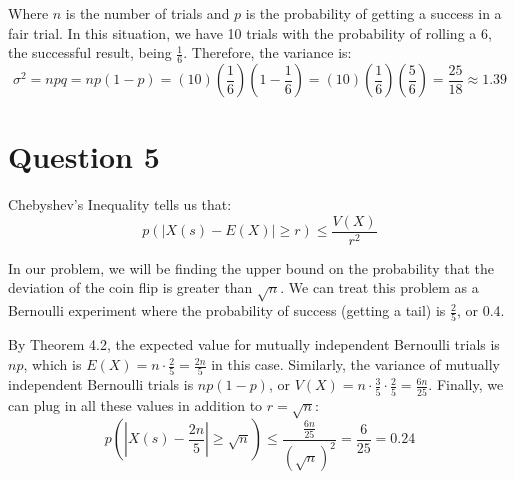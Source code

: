 \documentclass[letterpaper, 12pt]{article}
\begin{document}
Where $n$ is the number of trials and $p$ is the probability of getting a success in a fair trial. In this situation, we have 10 trials with the probability of rolling a 6, the successful result, being $\frac{1}{6}$. Therefore, the variance is:
\[\sigma^2 = npq = np(1-p) = (10)\left(\frac{1}{6}\right)\left(1- \frac{1}{6}\right) = (10)\left(\frac{1}{6}\right)\left(\frac{5}{6}\right) = \frac{25}{18} \approx 1.39\]

\section*{Question 5}
Chebyshev's Inequality tells us that:
\[p(\left|X(s) - E(X)\right| \geq r) \leq \frac{V(X)}{r^2}\]

In our problem, we will be finding the upper bound on the probability that the deviation of the coin flip is greater than $\sqrt{n}$. We can treat this problem as a Bernoulli experiment where the probability of success (getting a tail) is $\frac{2}{5}$, or 0.4. 

By Theorem 4.2, the expected value for mutually independent Bernoulli trials is $np$, which is $E(X) = n \cdot \frac{2}{5} = \frac{2n}{5}$ in this case. Similarly, the variance of mutually independent Bernoulli trials is $np(1-p)$, or $V(X) = n \cdot \frac{3}{5} \cdot \frac{2}{5} = \frac{6n}{25}$. Finally, we can plug in all these values in addition to $r = \sqrt{n}$:
\[p\left(\left|X(s) - \frac{2n}{5}\right| \geq \sqrt{n} \right) \leq \frac{\frac{6n}{25}}{{(\sqrt{n})}^2} = \frac{6}{25} = 0.24\]
\end{document}
